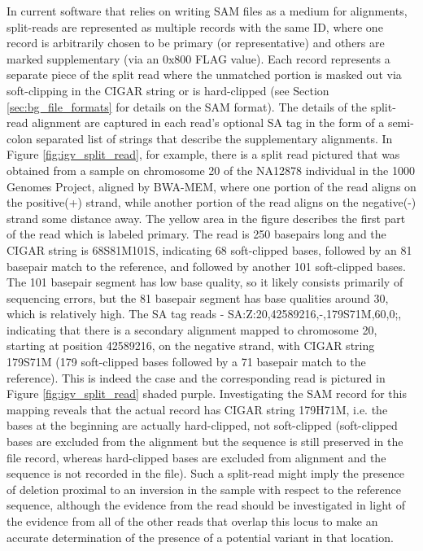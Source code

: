 In current software that relies on writing SAM files as a medium for alignments, split-reads are represented as multiple records with the same ID, where one record is arbitrarily chosen to be primary (or representative) and others are marked supplementary (via an 0x800 FLAG value). Each record represents a separate piece of the split read where the unmatched portion is masked out via soft-clipping in the CIGAR string or is hard-clipped (see Section \ref{sec:bg_file_formats} for details on the SAM format). The details of the split-read alignment are captured in each read's optional SA tag in the form of a semi-colon separated list of strings that describe the supplementary alignments. In Figure \ref{fig:igv_split_read}, for example, there is a split read pictured that was obtained from a sample on chromosome 20 of the NA12878 individual in the 1000 Genomes Project, aligned by BWA-MEM, where one portion of the read aligns on the positive(+) strand, while another portion of the read aligns on the negative(-) strand some distance away. The yellow area in the figure describes the first part of the read which is labeled primary. The read is 250 basepairs long and the CIGAR string is 68S81M101S, indicating 68 soft-clipped bases, followed by an 81 basepair match to the reference, and followed by another 101 soft-clipped bases. The 101 basepair segment has low base quality, so it likely consists primarily of sequencing errors, but the 81 basepair segment has base qualities around 30, which is relatively high. The SA tag reads - SA:Z:20,42589216,-,179S71M,60,0;, indicating that there is a secondary alignment mapped to chromosome 20, starting at position 42589216, on the negative strand, with CIGAR string 179S71M (179 soft-clipped bases followed by a 71 basepair match to the reference). This is indeed the case and the corresponding read is pictured in Figure \ref{fig:igv_split_read} shaded purple. Investigating the SAM record for this mapping reveals that the actual record has CIGAR string 179H71M, i.e. the bases at the beginning are actually hard-clipped, not soft-clipped (soft-clipped bases are excluded from the alignment but the sequence is still preserved in the file record, whereas hard-clipped bases are excluded from alignment and the sequence is not recorded in the file). Such a split-read might imply the presence of deletion proximal to an inversion in the sample with respect to the reference sequence, although the evidence from the read should be investigated in light of the evidence from all of the other reads that overlap this locus to make an accurate determination of the presence of a potential variant in that location.


